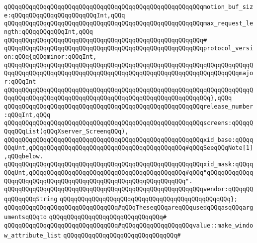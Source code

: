 \verb|qQQqqQQqqQQqqQQqqQQqqQQqqQQqqQQqqQQqqQQqqQQqqQQqqQQqqQQqmotion_buf_size:qQQqqQQqqQQqqQQqqQQqqQQqInt,qQQq|\newline
\verb|qQQqqQQqqQQqqQQqqQQqqQQqqQQqqQQqqQQqqQQqqQQqqQQqqQQqqQQqmax_request_length:qQQqqQQqqQQqInt,qQQq|\newline
\verb|qQQqqQQqqQQqqQQqqQQqqQQqqQQqqQQqqQQqqQQqqQQqqQQqqQQqqQQq#|\newline
\verb|qQQqqQQqqQQqqQQqqQQqqQQqqQQqqQQqqQQqqQQqqQQqqQQqqQQqqQQqprotocol_version:qQQq{qQQqminor:qQQqInt,|\newline
\verb|qQQqqQQqqQQqqQQqqQQqqQQqqQQqqQQqqQQqqQQqqQQqqQQqqQQqqQQqqQQqqQQqqQQqqQQqqQQqqQQqqQQqqQQqqQQqqQQqqQQqqQQqqQQqqQQqqQQqqQQqqQQqqQQqqQQqqQQqmajor:qQQqInt|\newline
\verb|qQQqqQQqqQQqqQQqqQQqqQQqqQQqqQQqqQQqqQQqqQQqqQQqqQQqqQQqqQQqqQQqqQQqqQQqqQQqqQQqqQQqqQQqqQQqqQQqqQQqqQQqqQQqqQQqqQQqqQQqqQQqqQQq},qQQq|\newline
\verb|qQQqqQQqqQQqqQQqqQQqqQQqqQQqqQQqqQQqqQQqqQQqqQQqqQQqqQQqrelease_number:qQQqInt,qQQq|\newline
\newline
\verb|qQQqqQQqqQQqqQQqqQQqqQQqqQQqqQQqqQQqqQQqqQQqqQQqqQQqqQQqscreens:qQQqqQQqqQQqList(qQQqXserver_ScreenqQQq),|\newline
\newline
\verb|qQQqqQQqqQQqqQQqqQQqqQQqqQQqqQQqqQQqqQQqqQQqqQQqqQQqqQQqxid_base:qQQqqQQqUnt,qQQqqQQqqQQqqQQqqQQqqQQqqQQqqQQqqQQqqQQqqQQq#qQQqSeeqQQqNote[1],qQQqbelow.|\newline
\verb|qQQqqQQqqQQqqQQqqQQqqQQqqQQqqQQqqQQqqQQqqQQqqQQqqQQqqQQqxid_mask:qQQqqQQqUnt,qQQqqQQqqQQqqQQqqQQqqQQqqQQqqQQqqQQqqQQqqQQq#qQQq"qQQqqQQqqQQqqQQqqQQqqQQqqQQqqQQqqQQqqQQqqQQqqQQqqQQqqQQqqQQqqQQq".|\newline
\newline
\verb|qQQqqQQqqQQqqQQqqQQqqQQqqQQqqQQqqQQqqQQqqQQqqQQqqQQqqQQqvendor:qQQqqQQqqQQqqQQqString|\newline
\verb|qQQqqQQqqQQqqQQqqQQqqQQqqQQqqQQqqQQqqQQqqQQqqQQq};|\newline
\newline
\verb|qQQqqQQqqQQqqQQqqQQqqQQqqQQqqQQq#qQQqTheseqQQqareqQQqusedqQQqasqQQqargumentsqQQqto|\newline
\verb|qQQqqQQqqQQqqQQqqQQqqQQqqQQqqQQq#|\newline
\verb|qQQqqQQqqQQqqQQqqQQqqQQqqQQqqQQq#qQQqqQQqqQQqqQQqqQQqvalue::make_window_attribute_list|\newline
\verb|qQQqqQQqqQQqqQQqqQQqqQQqqQQqqQQq#|\newline
